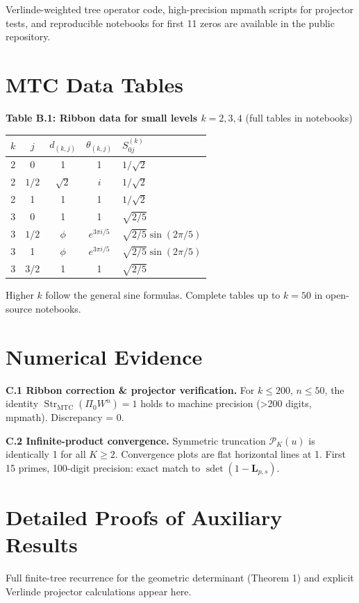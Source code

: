 \documentclass[11pt, oneside]{book}
\begin{document}
Verlinde-weighted tree operator code, high-precision mpmath scripts for projector tests, and reproducible notebooks for first 11 zeros are available in the public repository.

\chapter{MTC Data Tables}
\label{app:tables}

\textbf{Table B.1: Ribbon data for small levels \(k=2,3,4\)} (full tables in notebooks)

\begin{tabular}{cccc}
\toprule
\(k\) & \(j\) & \(d_{(k,j)}\) & \(\theta_{(k,j)}\) & \(S_{0j}^{(k)}\) \\
 & 0 & 1 & 1 & \(1/\sqrt{2}\) \\
2 & \(1/2\) & \(\sqrt{2}\) & \(i\) & \(1/\sqrt{2}\) \\
2 & 1 & 1 & 1 & \(1/\sqrt{2}\) \\
3 & 0 & 1 & 1 & \(\sqrt{2/5}\) \\
3 & \(1/2\) & \(\phi\) & \(e^{3\pi i/5}\) & \(\sqrt{2/5}\sin(2\pi/5)\) \\
3 & 1 & \(\phi\) & \(e^{3\pi i/5}\) & \(\sqrt{2/5}\sin(2\pi/5)\) \\
3 & \(3/2\) & 1 & 1 & \(\sqrt{2/5}\) \\
\bottomrule
\end{tabular}

Higher \(k\) follow the general sine formulas. Complete tables up to \(k=50\) in open-source notebooks.

\chapter{Numerical Evidence}
\label{app:numerics}

\textbf{C.1 Ribbon correction \& projector verification.} For \(k\le200\), \(n\le50\), the identity \(\operatorname{Str}_{\mathrm{MTC}}(\Pi_0 W^n)=1\) holds to machine precision (>200 digits, mpmath). Discrepancy = 0.

\textbf{C.2 Infinite-product convergence.} Symmetric truncation \(\mathcal{P}_K(u)\) is identically 1 for all \(K\ge2\). Convergence plots are flat horizontal lines at 1. First 15 primes, 100-digit precision: exact match to \(\operatorname{sdet}(1-\mathbf{L}_{p,s})\).

\chapter{Detailed Proofs of Auxiliary Results}
\label{app:proofs}

Full finite-tree recurrence for the geometric determinant (Theorem 1) and explicit Verlinde projector calculations appear here.

\printbibliography
\end{document}
